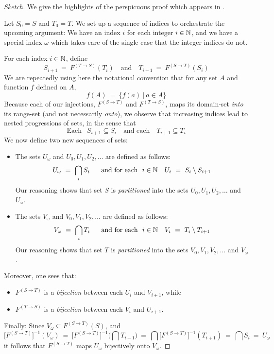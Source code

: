 \begin{proof}[Sketch]
We give the highlights of the perspicuous proof which appears in \cite{Tonien07}.

Let $S_0 = S$ and $T_0 = T$.  We set up a sequence of indices to
orchestrate the upcoming argument: We have an index $i$ for each
integer $i \in \mathbb{N}$, and we have a special index $\omega$ which takes
care of the single case that the integer indices do not.


For each index $i \in \mathbb{N}$, define
\[ S_{i+1} \ = \ F^{(T \rightarrow S)}(T_i) \ \ \ \mbox{ and }
\ \ \ T_{i+1} \ = \ F^{(S \rightarrow T)}(S_i) 
\]
We are repeatedly using here the notational convention that for any
set $A$ and function $f$ defined on $A$,
\[ f(A) \ = \ \{ f(a) \ | \ a \in A \} \]
Because each of our injections, $F^{(S \rightarrow T)}$ and $F^{(T \rightarrow S)}$,
maps its domain-set {\em into} its
range-set (and not necessarily {\em onto}), we observe that increasing indices lead to nested
progressions of sets, in the sense that
\[ \mbox{Each } \ \  S_{i+1} \subseteq S_i
 \ \ \ \mbox{ and each } \ \ \ 
 T_{i+1} \subseteq T_i
\]
We now define two new sequences of sets:
\begin{itemize}
\item
The sets $U_\omega$  and $U_0, U_1, U_2, \ldots$ are defined as
follows:
\[ U_\omega \ = \ \bigcap_i S_i \ \ \ \ \
\mbox{and for each } \  i \in \N \ \ \  U_i \ = \ S_i \setminus S_{i+1} \]
Our reasoning shows that set $S$ is {\em partitioned} into the sets
$U_0, U_1, U_2, \ldots$ and $U_\omega$.
\item
The sets $V_\omega$  and $V_0, V_1, V_2, \ldots$ are defined as
follows:
\[ V_\omega \ = \ \bigcap_i T_i \ \ \ \ \
\mbox{and for each } \  i \in \N \ \ \  V_i \ = \ T_i \setminus T_{i+1}
\]
Our reasoning shows that set $T$ is {\em partitioned} into the sets
$V_0, V_1, V_2, \ldots$ and $V_\omega$.
\end{itemize}
Moreover, one sees that:
\begin{itemize}
\item
$F^{(S \rightarrow T)}$ is a {\em bijection} between each $U_i$ and
  $V_{i+1}$, while
\item
$F^{(T \rightarrow S)}$ is a {\em bijection} between each $V_i$ and
  $U_{i+1}$.
\end{itemize}
Finally:
Since $V_\omega \subseteq F^{(S \rightarrow T)}(S)$, and
\[ \Big[F^{(S \rightarrow T)}\Big]^{-1} (V_\omega) \ = \
\Big[F^{(S \rightarrow T)}\Big]^{-1} \Big(\bigcap T_{i+1} \Big) \ = \
\bigcap \Big[F^{(S \rightarrow T)}\Big]^{-1} (T_{i+1}) \ = \
\bigcap S_i \ = \ U_\omega
\]
it follows that $F^{(S \rightarrow T)}$ maps $U_\omega$ bijectively onto $V_\omega$.


\end{proof}

